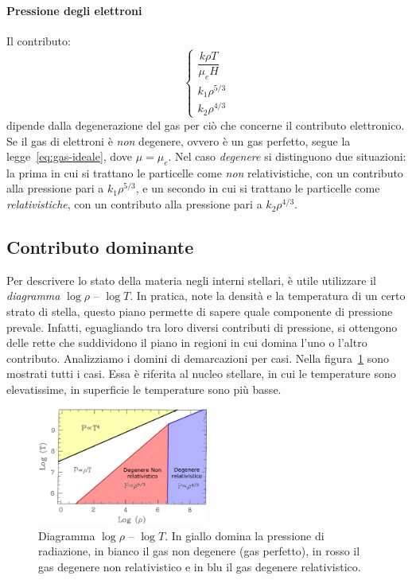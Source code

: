 \paragraph{Pressione degli elettroni}
Il contributo:
\[
\begin{cases} 
    \dfrac{k \rho T}{\mu_e H} \\ 
    k_1 \rho^{5/3} \\ 
    k_2 \rho^{4/3}
    \end{cases}
\]
dipende dalla degenerazione del gas per ciò che concerne il contributo elettronico. Se il gas di elettroni è \emph{non} degenere, ovvero è un gas perfetto, segue la legge~\eqref{eq:gas-ideale}, dove $\mu = \mu_e$. Nel caso \emph{degenere} si distinguono due situazioni: la prima in cui si trattano le particelle come \emph{non} relativistiche, con un contributo alla pressione pari a $k_1 \rho^{5/3}$, e un secondo in cui si trattano le particelle come \emph{relativistiche}, con un contributo alla pressione pari a $k_2 \rho^{4/3}$.

\subsection{Contributo dominante}
Per descrivere lo stato della materia negli interni stellari, è utile utilizzare il \emph{diagramma} $\log \rho$ -- $\log T$. In pratica, note la densità e la temperatura di un certo strato di stella, questo piano permette di sapere quale componente di pressione prevale. Infatti, eguagliando tra loro diversi contributi di pressione, si ottengono delle rette che suddividono il piano in regioni in cui domina l'uno o l'altro contributo. Analizziamo i domini di demarcazioni per casi. Nella figura~\ref{fig:diagramma-logrho-logt} sono mostrati tutti i casi. Essa è riferita al nucleo stellare, in cui le temperature sono elevatissime, in superficie le temperature sono più basse.

\begin{figure}
\centering
\includegraphics[width=0.5\textwidth]{immagini/piano-log-log.png}
\caption{Diagramma $\log \rho$ -- $\log T$. In giallo domina la pressione di radiazione, in bianco il gas non degenere (gas perfetto), in rosso il gas degenere non relativistico e in blu il gas degenere relativistico.}
\label{fig:diagramma-logrho-logt}
\end{figure}

